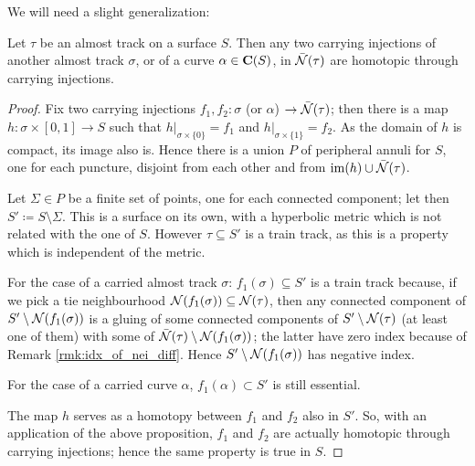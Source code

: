 We will need a slight generalization:
\begin{coroll}\label{cor:carryingunique}
Let $\tau$ be an almost track on a surface $S$. Then any two carrying injections of another almost track $\sigma$, or of a curve $\alpha\in\mathbf C(S)$, in $\bar{{\mathcal N}}(\tau)$ are homotopic through carrying injections.
\end{coroll}
\begin{proof}
Fix two carrying injections $f_1,f_2:\sigma$ (or $\alpha$) $\rightarrow\bar{{\mathcal N}}(\tau)$; then there is a map $h: \sigma \times [0,1]\rightarrow S$ such that $h|_{\sigma\times\{0\}}=f_1$ and $h|_{\sigma\times\{1\}}=f_2$. As the domain of $h$ is compact, its image also is. Hence there is a union $P$ of peripheral annuli for $S$, one for each puncture, disjoint from each other and from $\mathrm{im}(h)\cup\bar{{\mathcal N}}(\tau)$.

Let $\Sigma \in P$ be a finite set of points, one for each connected component; let then $S'\coloneqq S\setminus \Sigma$. This is a surface on its own, with a hyperbolic metric which is not related with the one of $S$. However $\tau\subseteq S'$ is a train track, as this is a property which is independent of the metric.

For the case of a carried almost track $\sigma$: $f_1(\sigma)\subseteq S'$ is a train track because, if we pick a tie neighbourhood ${\mathcal N}(f_1(\sigma))\subseteq{\mathcal N}(\tau)$, then any connected component of $S'\setminus{\mathcal N}(f_1(\sigma))$ is a gluing of some connected components of $S'\setminus{\mathcal N}(\tau)$ (at least one of them) with some of $\bar{{\mathcal N}}(\tau)\setminus {\mathcal N}(f_1(\sigma))$; the latter have zero index because of Remark \ref{rmk:idx_of_nei_diff}. Hence $S'\setminus{\mathcal N}(f_1(\sigma))$ has negative index.

For the case of a carried curve $\alpha$, $f_1(\alpha)\subset S'$ is still essential.

The map $h$ serves as a homotopy between $f_1$ and $f_2$ also in $S'$. So, with an application of the above proposition, $f_1$ and $f_2$ are actually homotopic through carrying injections; hence the same property is true in $S$.
\end{proof}


